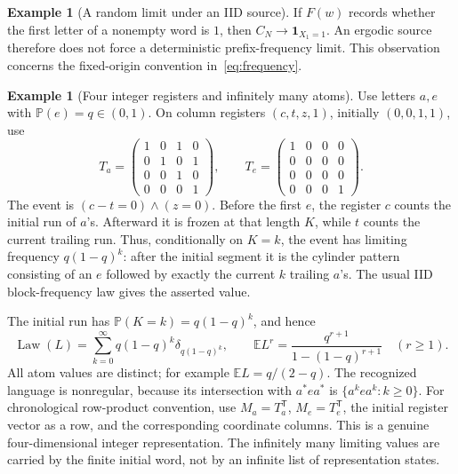 \documentclass[11pt]{article}
\theoremstyle{definition}
\newtheorem{example}[theorem]{Example}
\theoremstyle{remark}
\newcommand{\E}{\mathbb E}
\newcommand{\PP}{\mathbb P}
\newcommand{\one}{\mathbf 1}
\newcommand{\Law}{\operatorname{Law}}
\begin{document}
\begin{example}[A random limit under an IID source]
If $F(w)$ records whether the first letter of a nonempty word is $1$, then $C_N\to\one_{X_1=1}$. An ergodic source therefore does not force a deterministic prefix-frequency limit. This observation concerns the fixed-origin convention in~\eqref{eq:frequency}.
\end{example}

\begin{example}[Four integer registers and infinitely many atoms]\label{ex:infinite}
Use letters $a,e$ with $\PP(e)=q\in(0,1)$. On column registers $(c,t,z,1)$, initially $(0,0,1,1)$, use
\[
 T_a=\begin{pmatrix}1&0&1&0\\0&1&0&1\\0&0&1&0\\0&0&0&1\end{pmatrix},
 \qquad
 T_e=\begin{pmatrix}1&0&0&0\\0&0&0&0\\0&0&0&0\\0&0&0&1\end{pmatrix}.
\]
The event is $(c-t=0)\wedge(z=0)$. Before the first $e$, the register $c$ counts the initial run of $a$'s. Afterward it is frozen at that length $K$, while $t$ counts the current trailing run. Thus, conditionally on $K=k$, the event has limiting frequency $q(1-q)^k$: after the initial segment it is the cylinder pattern consisting of an $e$ followed by exactly the current $k$ trailing $a$'s. The usual IID block-frequency law gives the asserted value.

The initial run has $\PP(K=k)=q(1-q)^k$, and hence
\begin{equation}\label{eq:infinite}
 \Law(L)=\sum_{k=0}^\infty q(1-q)^k\delta_{q(1-q)^k},\qquad
 \E L^r=\frac{q^{r+1}}{1-(1-q)^{r+1}}\quad(r\geq1).
\end{equation}
All atom values are distinct; for example $\E L=q/(2-q)$. The recognized language is nonregular, because its intersection with $a^*ea^*$ is $\{a^kea^k:k\geq0\}$. For chronological row-product convention, use $M_a=T_a^\mathsf T$, $M_e=T_e^\mathsf T$, the initial register vector as a row, and the corresponding coordinate columns. This is a genuine four-dimensional integer representation. The infinitely many limiting values are carried by the finite initial word, not by an infinite list of representation states.
\end{example}
\end{document}
